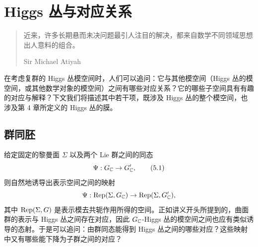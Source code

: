 
\section{Higgs 丛与对应关系}

\begin{quote}
\kaishu
近来，许多长期悬而未决问题最引人注目的解决，都来自数学不同领域思想出人意料的组合。

\rmfamily\hfill Sir Michael Atiyah
\end{quote}

在考虑复群的 Higgs 丛模空间时，人们可以追问：它与其他模空间（Higgs 丛的模空间，或其他数学对象的模空间）之间有哪些对应关系？它的哪些子空间具有有趣的对应与解释？下文我们将描述其中若干项，既涉及 Higgs 丛的整个模空间，也涉及第 4 章所定义的 Higgs 丛的膜。


\subsection{群同胚}


给定固定的黎曼面 $\Sigma$ 以及两个 Lie 群之间的同态
\begin{equation}
\Psi : G_{\mathbb{C}}\to G'_{\mathbb{C}}, \tag{5.1}
\end{equation}
则自然地诱导出表示空间之间的映射
\[
\Psi : \operatorname{Rep}(\Sigma,G_{\mathbb{C}})\to \operatorname{Rep}(\Sigma,G'_{\mathbb{C}}),
\]
其中 $\operatorname{Rep}(\Sigma,G)$ 是表示模去共轭作用所得的空间。正如讲义开头所提到的，曲面群的表示与 Higgs 丛之间存在对应，因此 $G_{\mathbb{C}}$-Higgs 丛的模空间之间也应有类似诱导的态射。于是可以追问：由群同态能得到 Higgs 丛之间的哪些对应？这些映射中又有哪些能下降为子群之间的对应？


